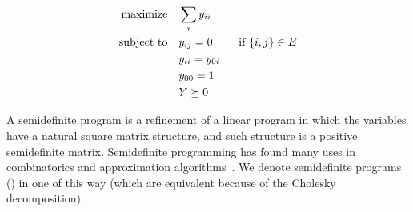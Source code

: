 \documentclass[a4paper,twoside,justified]{tufte-handout}
\begin{document}
\begin{alignat*}{2}
  \text{maximize}\hspace{1em}& \sum_{i}y_{ii}\\
  \text{subject to}\hspace{1em}& y_{ij} =0 \qquad \text{\ if $\{i,j\}\in E$}\\
  & y_{ii} = y_{0i} \\
  & y_{00} = 1\\
  & Y \succeq 0
\end{alignat*}

A semidefinite program is a refinement of a linear program in which
the variables have a natural square matrix structure, and such
structure is a positive semidefinite matrix. Semidefinite programming
has found many uses in combinatorics and approximation
algorithms~\cite{gartner2012approximation}.
%
We denote semidefinite programs (\sdp) in one of this way (which are
equivalent because of the Cholesky decomposition).
\end{document}
